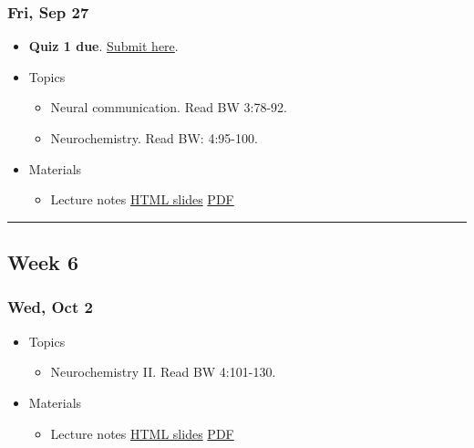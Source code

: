 \documentclass[]{article}
\providecommand{\tightlist}{%
  \setlength{\itemsep}{0pt}\setlength{\parskip}{0pt}}
\begin{document}
\hypertarget{fri-sep-27}{%
\subsubsection{Fri, Sep 27}\label{fri-sep-27}}

\begin{itemize}
\tightlist
\item
  \textbf{Quiz 1 due}. \href{}{Submit here}.
\item
  Topics

  \begin{itemize}
  \tightlist
  \item
    Neural communication. Read BW 3:78-92.
  \item
    Neurochemistry. Read BW: 4:95-100.
  \end{itemize}
\item
  Materials

  \begin{itemize}
  \tightlist
  \item
    Lecture notes \textbar{} \href{}{HTML slides} \textbar{}
    \href{}{PDF}
  \end{itemize}
\end{itemize}

\begin{center}\rule{0.5\linewidth}{\linethickness}\end{center}

\hypertarget{week-6}{%
\subsection{Week 6}\label{week-6}}

\hypertarget{wed-oct-2}{%
\subsubsection{Wed, Oct 2}\label{wed-oct-2}}

\begin{itemize}
\tightlist
\item
  Topics

  \begin{itemize}
  \tightlist
  \item
    Neurochemistry II. Read BW 4:101-130.
  \end{itemize}
\item
  Materials

  \begin{itemize}
  \tightlist
  \item
    Lecture notes \textbar{} \href{}{HTML slides} \textbar{}
    \href{}{PDF}
  \end{itemize}
\end{itemize}
\end{document}
